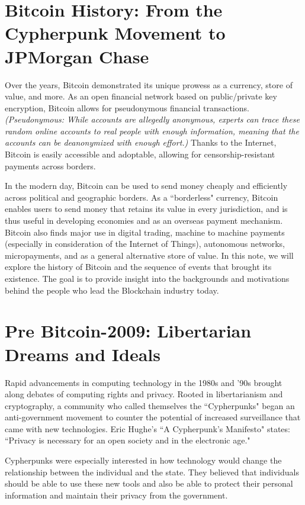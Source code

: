 \documentclass[11pt]{article}
\begin{document}
    \thispagestyle{firstpage}
    \vspace*{2\baselineskip}
    \section*{Bitcoin History: From the Cypherpunk Movement to JPMorgan Chase}
    Over the years, Bitcoin demonstrated its unique prowess as a currency, store of value, and more. As an open financial network based on public/private key encryption, Bitcoin allows for pseudonymous financial transactions. \textit{(Pseudonymous: While accounts are allegedly anonymous, experts can trace these random online accounts to real people with enough information, meaning that the accounts can be deanonymized with enough effort.)} Thanks to the Internet, Bitcoin is easily accessible and adoptable, allowing for censorship-resistant payments across borders.
    
    In the modern day, Bitcoin can be used to send money cheaply and efficiently across political and geographic borders. As a ``borderless" currency, Bitcoin enables users to send money that retains its value in every jurisdiction, and is thus useful in developing economies and as an overseas payment mechanism.  Bitcoin also finds major use in digital trading, machine to machine payments (especially in consideration of the Internet of Things), autonomous networks, micropayments, and as a general alternative store of value. In this note, we will explore the history of Bitcoin and the sequence of events that brought its existence. The goal is to provide insight into the backgrounds and motivations behind the people who lead the Blockchain industry today.
    
    \section*{Pre Bitcoin-2009: Libertarian Dreams and Ideals}
    Rapid advancements in computing technology in the 1980s and '90s brought along debates of computing rights and privacy. Rooted in libertarianism and cryptography, a community who called themselves the ``Cypherpunks" began an anti-government movement to counter the potential of increased surveillance that came with new technologies. Eric Hughe's ``A Cypherpunk's Manifesto" states: ``Privacy is necessary for an open society and in the electronic age."
    
    Cypherpunks were especially interested in how technology would change the relationship between the individual and the state. They believed that individuals should be able to use these new tools and also be able to protect their personal information and maintain their privacy from the government.
    
\end{document}
